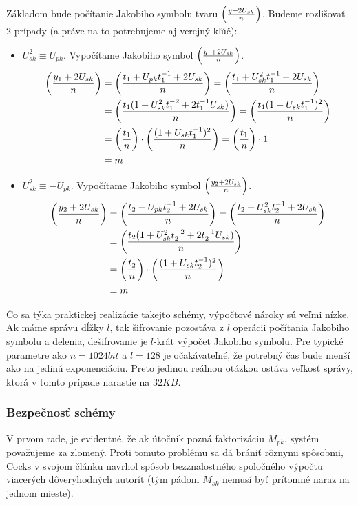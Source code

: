 Základom bude počítanie Jakobiho symbolu tvaru $\left( \frac{y +2 U_{sk}}{n} \right)$.
Budeme rozlišovať 2 prípady (a práve na to potrebujeme aj verejný kľúč):
\begin{itemize}
    \item $U_{sk}^2 \equiv U_{pk}$.
        Vypočítame Jakobiho symbol $\left( \frac{y_1 + 2U_{sk}}{n} \right)$.
        \begin{align*}
            \left( \frac{y_1 + 2U_{sk}}{n} \right) &=
            \left( \frac{t_1 + U_{pk} t_1^{-1} + 2 U_{sk}}{n} \right) =
            \left( \frac{t_1 + U_{sk}^2 t_1^{-1} + 2 U_{sk}}{n} \right) \\
            &=
            \left( \frac{t_1(1 + U_{sk}^2 t_1^{-2} + 2 t_1^{-1} U_{sk})}{n} \right) =
            \left( \frac{t_1(1+U_{sk}t_1^{-1})^2}{n} \right)  \\
            &=
            \left( \frac{t_1}{n} \right) \cdot \left( \frac{(1+U_{sk}t_1^{-1})^2}{n} \right)=
            \left( \frac{t_1}{n} \right) \cdot 1 \\
            &= m
        \end{align*}

    \item $U_{sk}^2 \equiv -U_{pk}$.
        Vypočítame Jakobiho symbol $\left( \frac{y_2 + 2U_{sk}}{n} \right)$.
        \begin{align*}
            \left( \frac{y_2 + 2U_{sk}}{n} \right) &=
            \left( \frac{t_2 - U_{pk} t_2^{-1} + 2 U_{sk}}{n} \right) =
            \left( \frac{t_2 + U_{sk}^2 t_2^{-1} + 2 U_{sk}}{n} \right) \\
            &=
            \left( \frac{t_2(1 + U_{sk}^2 t_2^{-2} + 2 t_2^{-1} U_{sk})}{n} \right)
            \\
            &=
            \left( \frac{t_2}{n} \right) \cdot \left( \frac{(1+U_{sk}t_2^{-1})^2}{n} \right) \\
            &= m
        \end{align*}
\end{itemize}

Čo sa týka praktickej realizácie takejto schémy, výpočtové nároky sú
veľmi nízke. Ak máme správu dĺžky $l$, tak
šifrovanie pozostáva z $l$ operácii počítania Jakobiho
symbolu a delenia, dešifrovanie je $l$-krát výpočet Jakobiho symbolu.
Pre typické parametre ako $n=1024 \unit{bit}$ a $l=128$ je očakávateľné, že
potrebný čas bude menší ako na jedinú exponenciáciu. Preto jedinou
reálnou otázkou ostáva veľkosť správy, ktorá v tomto prípade narastie
na $32KB$.

\subsubsection{Bezpečnosť schémy}
V prvom rade, je evidentné, že ak útočník pozná faktorizáciu $M_{pk}$,
systém považujeme za zlomený. Proti tomuto problému sa dá brániť
rôznymi spôsobmi, Cocks v svojom článku navrhol spôsob bezznalostného
spoločného výpočtu viacerých dôveryhodných autorít (tým pádom $M_{sk}$
nemusí byť prítomné naraz na jednom mieste).

